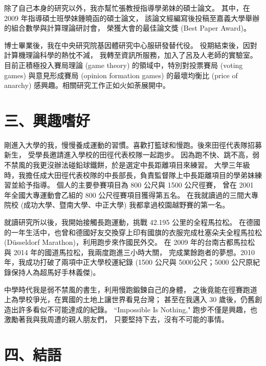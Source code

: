 \documentclass[10pt,a4paper]{article}
\begin{document}
除了自己本身的研究以外，我亦幫忙張教授指導學弟妹的碩士論文。
其中，在 2009 年指導碩士班學妹鍾曉函的碩士論文，
該論文經編寫後投稿至嘉義大學舉辦的組合數學與計算理論研討會，
榮獲大會的最佳論文獎 (Best Paper Award)。


博士畢業後，我在中央研究院基因體研究中心服研發替代役。
役期結束後，因對計算機理論科學的熱忱不減，
我轉至資訊所服務，加入了呂及人老師的實驗室。
目前正積極投入賽局理論 (game theory) 的領域中，特別對投票賽局 (voting games) 
與意見形成賽局 (opinion formation games) 的最壞均衡比 (price of anarchy) 
感興趣。相關研究工作正如火如荼展開中。



\section*{\bf\large 三、興趣嗜好}
\label{sec:hobbies}


剛進入大學的我，慢慢養成運動的習慣。喜歡打籃球和慢跑。後來田徑代表隊招募新生，
受學長邀請進入學校的田徑代表校隊一起跑步。
因為跑不快、跳不高，弱不禁風的我更沒辦法碰鉛球鐵餅，於是選定中長距離項目來練習。
大學三年級時，我擔任成大田徑代表校隊的中長部長，負責監督隊上中長距離項目的學弟妹練習並給予指導。
個人的主要參賽項目為 800 公尺與 1500 公尺徑賽，
曾在 2001 年全國大專運動會乙組的 800 公尺徑賽項目獲得第五名。
在我就讀過的三間大專院校 (成功大學、暨南大學、中正大學) 我都拿過校園越野賽的第一名。


就讀研究所以後，我開始接觸長跑運動，挑戰 42.195 公里的全程馬拉松。
在德國的一年生活中，也曾和德國好友交換穿上印有國旗的衣服完成杜塞朵夫全程馬拉松 
(D\"{u}sseldorf Marathon)，利用跑步來作國民外交。
在 2009 年的台南古都馬拉松與 2014 年的國道馬拉松，我兩度跑進三小時大關，
完成業餘跑者的夢想。2010 年，我成功打破了兩項中正大學校運紀錄 
(1500 公尺與 5000公尺；5000 公尺原紀錄保持人為超馬好手林義傑)。 


中學時代我是弱不禁風的書生，利用慢跑鍛鍊自己的身體，
之後竟能在徑賽跑道上為學校爭光，在異國的土地上讓世界看見台灣；
甚至在我邁入 30 歲後，仍舊創造出許多看似不可能達成的紀錄。
``Impossible Is Nothing," 跑步不僅是興趣，也激勵著我與我周遭的親人朋友們，
只要堅持下去，沒有不可能的事情。



\section*{\bf\large 四、結語}
\label{sec:prospection}
\end{document}
